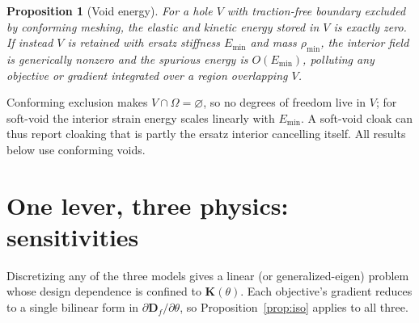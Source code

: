 \documentclass[preprint,11pt]{elsarticle}
\newcommand{\Df}{\mathbf{D}_f}
\newcommand{\Kmat}{\mathbf{K}}
\theoremstyle{plain}\newtheorem{proposition}{Proposition}
\theoremstyle{remark}\newtheorem{remark}{Remark}
\begin{document}
\begin{proposition}[Void energy]
\label{prop:void}
For a hole $V$ with traction-free boundary excluded by conforming meshing, the elastic and
kinetic energy stored in $V$ is exactly zero. If instead $V$ is retained with ersatz
stiffness $E_{\min}$ and mass $\rho_{\min}$, the interior field is generically nonzero and
the spurious energy is $O(E_{\min})$, polluting any objective or gradient integrated over a
region overlapping $V$.
\end{proposition}
\noindent Conforming exclusion makes $V\cap\Omega=\varnothing$, so no degrees of freedom
live in $V$; for soft-void the interior strain energy scales linearly with $E_{\min}$.
A soft-void cloak can thus report cloaking that is partly the ersatz interior cancelling
itself. All results below use conforming voids.

\section{One lever, three physics: sensitivities}
\label{sec:sens}
Discretizing any of the three models gives a linear (or generalized-eigen) problem whose
design dependence is confined to $\Kmat(\theta)$. Each objective's gradient reduces to a
single bilinear form in $\partial\Df/\partial\theta$, so Proposition~\ref{prop:iso}
applies to all three.
\end{document}
